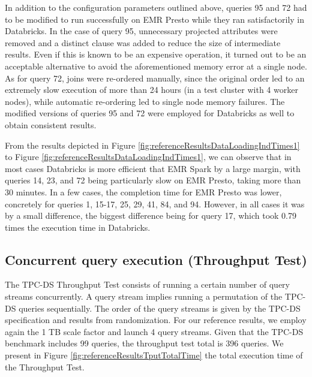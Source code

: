 In addition to the configuration parameters outlined above, queries 95 and 72 had to be modified to run successfully on EMR Presto while they ran satisfactorily in Databricks. In the case of query 95, unnecessary projected attributes were removed and a distinct clause was added to reduce the size of intermediate results. Even if this is known to be an expensive operation, it turned out to be an acceptable alternative to avoid the aforementioned memory error at a single node. As for query 72, joins were re-ordered manually, since the original order led to an extremely slow execution of more than 24 hours (in a test cluster with 4 worker nodes), while automatic re-ordering led to single node memory failures. The modified versions of queries 95 and 72 were employed for Databricks as well to obtain consistent results.

From the results depicted in Figure \ref{fig:referenceResultsDataLoadingIndTimes1} to Figure \ref{fig:referenceResultsDataLoadingIndTimes1}, we can observe that in most cases Databricks is more efficient that EMR Spark by a large margin, with queries 14, 23, and 72 being particularly slow on EMR Presto, taking more than 30 minutes. In a few cases, the completion time for EMR Presto was lower, concretely for queries 1, 15-17, 25, 29, 41, 84, and 94. However, in all cases it was by a small difference, the biggest difference being for query 17, which took 0.79 times the execution time in Databricks.

\subsection{Concurrent query execution (Throughput Test)}

The TPC-DS Throughput Test consists of running a certain number of query streams concurrently. A query stream implies running a permutation of the TPC-DS queries sequentially. The order of the query streams is given by the TPC-DS specification and results from randomization. For our reference results, we employ again the 1 TB scale factor and launch 4 query streams. Given that the TPC-DS benchmark includes 99 queries, the throughput test total is 396 queries. We present in Figure \ref{fig:referenceResultsTputTotalTime} the total execution time of the Throughput Test.

